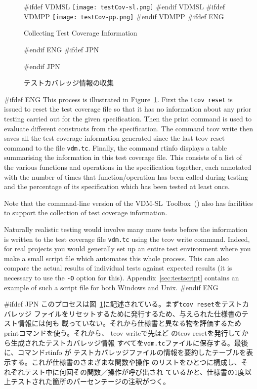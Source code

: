 \documentclass[\pformat,12pt]{article}
\newcommand{\vdmslpp}{VDM-SL}
\newcommand{\Toolbox}{Toolbox}
\newcommand{\vdmslpp}{VDM++}
\newcommand{\Toolbox}{Toolbox}
\newcommand{\guicmd}[1]{{\sf #1}}
\newcommand{\guicmd}[1]{{\gt #1}}
\begin{document}
\begin{figure}[tbh]
\begin{center}
#ifdef VDMSL
\texttt{[image: testCov-sl.png]}
#endif VDMSL
#ifdef VDMPP
\texttt{[image: testCov-pp.png]}
#endif VDMPP
#ifdef ENG
\caption{Collecting Test Coverage Information}
#endif ENG
#ifdef JPN
\caption{テストカバレッジ情報の収集}
#endif JPN
\label{fig:guitcov}
\end{center}
\end{figure}

#ifdef ENG
This process is illustrated in Figure~\ref{fig:guitcov}. First the 
{\tt tcov reset} is issued to
reset the test coverage file so that it has no information about any
prior testing carried out for the given specification. Then the
\guicmd{print} command is used to evaluate different constructs from
the specification. The command \guicmd{tcov write} then saves all the test coverage information
generated since the last \guicmd{tcov reset} command to the file
\texttt{vdm.tc}. Finally, the command \guicmd{rtinfo} 
displays a table summarising the information in
this test coverage 
file. This consists of a list of the various functions and operations
in the specification together, each annotated with the number of times
that function/operation has been called during testing and the
percentage of its specification which has been tested at least once.

Note that the command-line version of the \vdmslpp\ \Toolbox\ 
() also
has facilities to support the collection of test coverage
information.

Naturally realistic testing would involve many more tests before the
information is written to the test coverage file \texttt{vdm.tc} using the
\guicmd{tcov write} command. Indeed, for
real projects you would generally set up an entire test environment 
where you make a small script file which automates this whole
process. This can also compare the actual results of individual tests
against expected results (it is necessary to use the {\tt -O} option
for this).  Appendix~\ref{sec:testscript} contains an example of such
a script file for both Windows and Unix.
#endif ENG

#ifdef JPN
このプロセスは図~\ref{fig:guitcov}に記述されている。まず{\tt tcov reset}をテストカバレッジ
ファイルをリセットするために発行するため、与えられた仕様書のテスト情報には何も
載っていない。それから仕様書と異なる物を評価するため\guicmd{print}コマンドを使う。それから、
\guicmd{tcov write}で先ほど
の\guicmd{tcov reset}を発行してから生成されたテストカバレッジ情報
すべてを\texttt{vdm.tc}ファイルに保存する。最後に、コマンド\guicmd{rtinfo} が
テストカバレッジファイルの情報を要約したテーブルを表示する。これが仕様書のさまざまな関数や操作
のリストをひとつに構成し、それぞれテスト中に何回その関数／操作が呼び出され
ているかと、仕様書の1度以上テストされた箇所のパーセンテージの注釈がつく。
\end{document}
